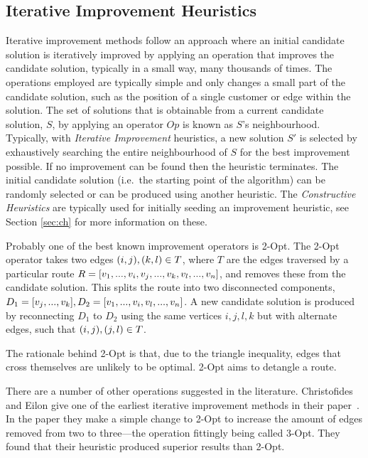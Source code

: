 \subsection{Iterative Improvement Heuristics}

Iterative improvement methods follow an approach where an initial candidate solution is iteratively improved by applying an operation that improves the candidate solution, typically in a small way, many thousands of times. The operations employed are typically simple and only changes a small part of the candidate solution, such as the position of a single customer or edge within the solution. The set of solutions that is obtainable from a current candidate solution, $S$, by applying an operator $Op$ is known as $S$'s neighbourhood. Typically, with \emph{Iterative Improvement} heuristics, a new solution $S'$ is selected by exhaustively searching the entire neighbourhood of $S$ for the best improvement possible. If no improvement can be found then the heuristic terminates. The initial candidate solution (i.e.~the starting point of the algorithm) can be randomly selected or can be produced using another heuristic. The \emph{Constructive Heuristics} are typically used for initially seeding an improvement heuristic, see Section \ref{sec:ch} for more information on these.
 
Probably one of the best known improvement operators is 2-Opt. The 2-Opt operator takes two edges $(i,j), (k,l) \in T$, where $T$ are the edges traversed by a particular route $R = [v_1, ..., v_i, v_j, ..., v_k, v_l, ..., v_n]$, and removes these from the candidate solution. This splits the route into two disconnected components, $D_1 = [v_j, ..., v_k], D_2 = [v_1, ..., v_i,v_l, ..., v_n]$. A new candidate solution is produced by reconnecting $D_1$ to $D_2$ using the same vertices $i,j,l,k$ but with alternate edges, such that $(i,j), (j,l) \in T$.


The rationale behind 2-Opt is that, due to the triangle inequality, edges that cross themselves are unlikely to be optimal. 2-Opt aims to detangle a route.

There are a number of other operations suggested in the literature. Christofides and Eilon give one of the earliest iterative improvement methods in their paper~\cite{CE:1969}. In the paper they make a simple change to 2-Opt to increase the amount of edges removed from two to three---the operation fittingly being called 3-Opt. They found that their heuristic produced superior results than 2-Opt.

